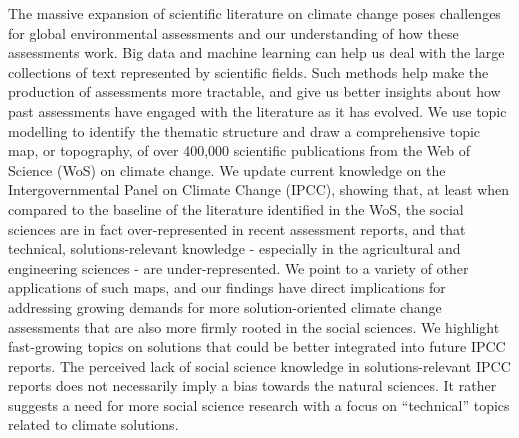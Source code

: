 \documentclass{article}
\begin{document}
	The massive expansion of scientific literature on climate change poses challenges for global environmental assessments and our understanding of how these assessments work. 
	Big data and machine learning can help us deal 
	with the large collections of text represented by scientific fields.
	Such methods help make the production of assessments
	more tractable, and give us better insights about how past assessments  have engaged with the literature as it has evolved.
	We use topic modelling to identify the thematic structure and draw a comprehensive topic map, or topography, of over 400,000 scientific publications from the Web of Science (WoS) on climate change. 
	We update current knowledge on the Intergovernmental Panel on Climate Change (IPCC), showing that, at least when compared to the baseline of the literature identified in the WoS,  the social sciences are in fact over-represented in recent assessment reports, and that
	technical, solutions-relevant knowledge - especially in the agricultural and engineering sciences - are under-represented.
	We point to a variety of other applications of such maps, and our findings have direct implications for addressing growing demands for more solution-oriented climate change assessments that are also more firmly rooted in the social sciences.
	We highlight fast-growing topics on solutions that could be better integrated into future IPCC reports. 
	The perceived lack of social science knowledge in solutions-relevant IPCC reports does not necessarily imply a bias towards the natural sciences. 
	It rather suggests a need for more social science research with a focus on ``technical'' topics related to climate solutions. 
\end{document}
